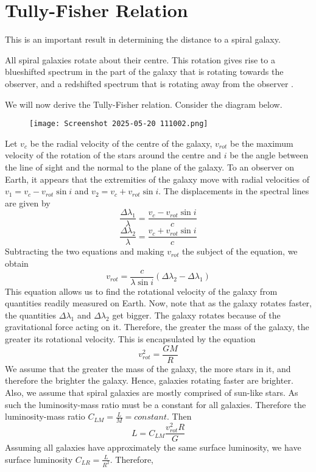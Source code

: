 \documentclass{article}
\theoremstyle{definition}
\begin{document}
\section{Tully-Fisher Relation}
This is an important result in determining the distance to a spiral galaxy. 
\begin{note}
    All spiral galaxies rotate about their centre. This rotation gives rise to a blueshifted spectrum in the part of the galaxy that is rotating towards the observer, and a redshifted spectrum that is rotating away from the observer .
\end{note}
We will now derive the Tully-Fisher relation. Consider the diagram below.
\begin{figure}[H]
    \centering
    \texttt{[image: Screenshot 2025-05-20 111002.png]}
\end{figure}
Let $v_c$ be the radial velocity of the centre of the galaxy, $v_{rot}$ be the maximum velocity of the rotation of the stars around the centre and $i$ be the angle between the line of sight and the normal to the plane of the galaxy. To an observer on Earth, it appears that the extremities of the galaxy move with radial velocities of $v_1=v_c-v_{rot}\sin i$ and $v_2=v_c+v_{rot}\sin i$. The displacements in the spectral lines are given by 
$$\frac{\Delta \lambda_1}{\lambda}=\frac{v_c-v_{rot}\sin i}{c}$$
$$\frac{\Delta \lambda_2}{\lambda}=\frac{v_c+v_{rot}\sin i}{c}$$
Subtracting the two equations and making $v_{rot}$ the subject of the equation, we obtain
$$v_{rot}=\frac{c}{\lambda \sin i}(\Delta\lambda _2-\Delta\lambda_1)$$
This equation allows us to find the rotational velocity of the galaxy from quantities readily measured on Earth. Now, note that as the galaxy rotates faster, the quantities $\Delta \lambda_1$ and $\Delta \lambda_2$ get bigger. The galaxy rotates because of the gravitational force acting on it. Therefore, the greater the mass of the galaxy, the greater its rotational velocity. This is encapsulated by the equation
$$v_{rot}^2=\frac{GM}{R}$$
We assume that the greater the mass of the galaxy, the more stars in it, and therefore the brighter the galaxy. Hence, galaxies rotating faster are brighter. Also, we assume that spiral galaxies are mostly comprised of sun-like stars. As such the luminosity-mass ratio must be a constant for all galaxies. Therefore the luminosity-mass ratio $C_{LM}=\frac{L}{M}=constant$. Then
$$L=C_{LM}\frac{v_{rot}^2R}{G}$$
\newpage
Assuming all galaxies have approximately the same surface luminosity, we have surface luminosity $C_{LR}=\frac{L}{R^2}$. Therefore, 
\end{document}
